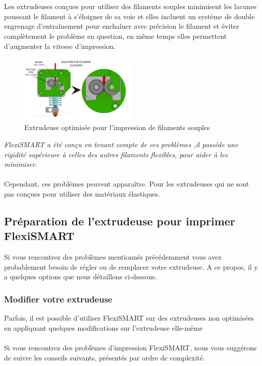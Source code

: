 \documentclass[11pt,a4paper]{article}
\begin{document}
\\\\
Les extrudeuses conçues pour utiliser des filaments souples minimisent les lacunes poussant le filament  à s’éloigner de sa voie  et elles incluent un système de double engrenage d’entraînement pour  enchaîner avec précision le filament et éviter complètement le problème en question, en même temps elles permettent d’augmenter la vitesse d’impression.
\begin{figure}[H]
\centering
\includegraphics[width=0.5\textwidth,cfbox=azul_marcos 4pt 0pt]{FOTOS/NUDOS2}
\caption*{Extrudeuse optimisée pour l’impression de filaments souples}
\end{figure}
\emph{FlexiSMART a été conçu en tenant compte de ces problèmes ,il possède une rigidité supérieure à celles des autres filaments flexibles, pour aider à les minimiser.}
\\\\
Cependant, ces problèmes peuvent apparaître. Pour les extrudeuses qui ne sont pas conçues pour utiliser des matériaux élastiques.
	\subsection{Préparation de l'extrudeuse pour imprimer FlexiSMART}Si vous rencontrez des problèmes mentionnés précédemment vous avez probablement besoin de régler ou de remplacer votre extrudeuse. A ce propos, il y a quelques options que nous détaillons ci-dessous.
		\subsubsection{Modifier votre extrudeuse}
Parfois, il est possible d'utiliser FlexiSMART sur des extrudeuses non optimisées en appliquant quelques modifications sur l'extrudeuse elle-même
\\\\
Si vous rencontrez des problèmes d’impression FlexiSMART, nous vous suggérons de suivre les conseils suivants, présentés par ordre de complexité.
\end{document}
